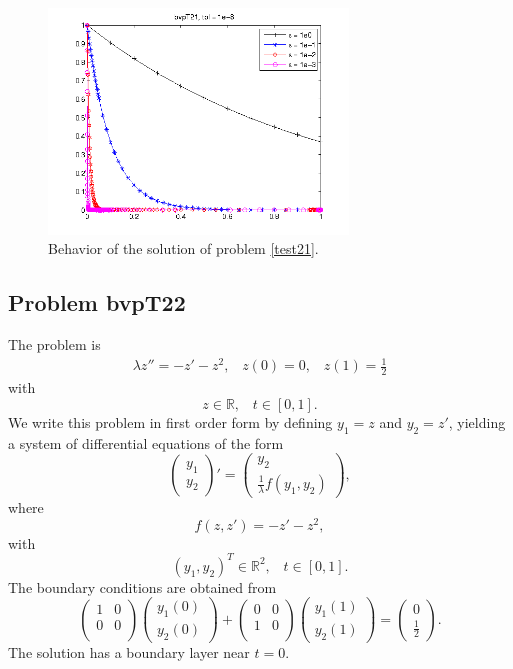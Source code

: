 \documentclass[<options>]{article}
\def \RR {{\mathbb{R}}}
\begin{document}
\begin{figure}[htb]
\centerline{\includegraphics[height=6cm]{Prob21}}
\caption{Behavior of the solution of problem \ref{test21}.}
\end{figure}
 \newpage
\subsection{Problem bvpT22}\label{test22}
The problem is 
\begin{eqnarray*}
\lambda z'' = - z' -  z^{2}, \;\;\;z(0) = 0, \;\;\; z(1) = \frac{1}{2}
\end{eqnarray*}
with
\[
z \in \RR, \;\;\; t\in [0,1].
\]
We write this problem in first order form by defining $y_1=z$ and $y_2=z'$, yielding a system of differential equations of the form
\begin{equation*}
\left(\begin{array}{c}
y_1\\
y_2
\end{array}\right)'=
\left(\begin{array}{c}
y_2\\
\frac{1}{\lambda}f(y_1,y_2)
\end{array}\right),
\end{equation*}
where
\begin{equation*}
f(z,z') = - z' -  z^{2},
\end{equation*}
with
\[
(y_1,y_2)^T \in \RR^{2}, \;\;\;  t \in [0,1].
\]
The  boundary conditions are obtained from
\begin{equation*}
\left(
  \begin{array}{cc}
    1 & 0 \\
    0 & 0 \\
  \end{array}
\right)
\left(\begin{array}{c}
y_{1}(0)\\
y_{2}(0)
\end{array}\right)
+
\left(
  \begin{array}{cc}
    0 & 0 \\
    1 & 0 \\
  \end{array}
\right)
\left(\begin{array}{c}
y_{1}(1)\\
y_{2}(1)
\end{array}\right)=\left(\begin{array}{c}
0 \\
\frac{1}{2}
\end{array}\right).
\end{equation*}
The solution has a boundary layer near $t = 0.$
\end{document}
